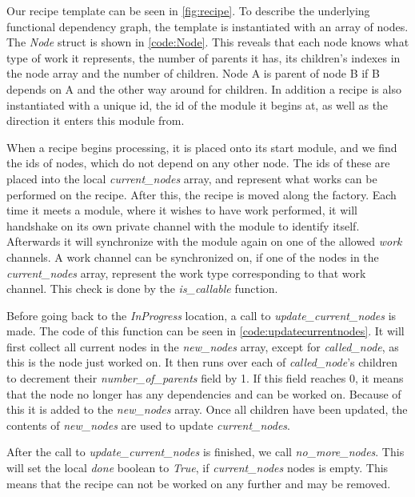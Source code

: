 Our recipe template can be seen in \cref{fig:recipe}. To describe the underlying functional dependency graph, the template is instantiated with an array of nodes. The \emph{Node} struct is shown in \cref{code:Node}. This reveals that each node knows what type of work it represents, the number of parents it has, its children's indexes in the node array and the number of children. Node A is parent of node B if B depends on A and the other way around for children. In addition a recipe is also instantiated with a unique id, the id of the module it begins at, as well as the direction it enters this module from. 



When a recipe begins processing, it is placed onto its start module, and we find the ids of nodes, which do not depend on any other node. The ids of these are placed into the local \emph{current\_nodes} array, and represent what works can be performed on the recipe. After this, the recipe is moved along the factory. Each time it meets a module, where it wishes to have work performed, it will handshake on its own private channel with the module to identify itself. Afterwards it will synchronize with the module again on one of the allowed \emph{work} channels. A work channel can be synchronized on, if one of the nodes in the \emph{current\_nodes} array, represent the work type corresponding to that work channel. This check is done by the \emph{is\_callable} function.

Before going back to the \emph{InProgress} location, a call to \emph{update\_current\_nodes} is made. The code of this function can be seen in \cref{code:updatecurrentnodes}. It will first collect all current nodes in the \emph{new\_nodes} array, except for \emph{called\_node}, as this is the node just worked on. It then runs over each of \emph{called\_node}'s children to decrement their \emph{number\_of\_parents} field by 1. If this field reaches 0, it means that the node no longer has any dependencies and can be worked on. Because of this it is added to the \emph{new\_nodes} array. Once all children have been updated, the contents of \emph{new\_nodes} are used to update \emph{current\_nodes}.  



After the call to \emph{update\_current\_nodes} is finished, we call \emph{no\_more\_nodes}. This will set the local \emph{done} boolean to \emph{True}, if \emph{current\_nodes} nodes is empty. This means that the recipe can not be worked on any further and may be removed.

